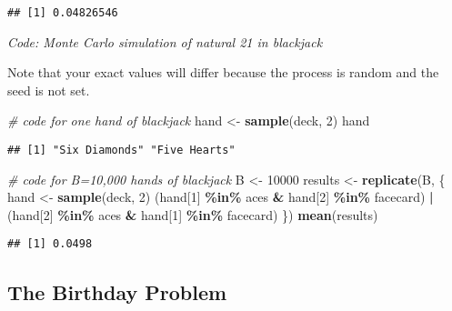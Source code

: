 \documentclass[
]{article}
\newenvironment{Shaded}{\begin{snugshade}}{\end{snugshade}}
\newcommand{\CommentTok}[1]{\textcolor[rgb]{0.56,0.35,0.01}{\textit{#1}}}
\newcommand{\DecValTok}[1]{\textcolor[rgb]{0.00,0.00,0.81}{#1}}
\newcommand{\KeywordTok}[1]{\textcolor[rgb]{0.13,0.29,0.53}{\textbf{#1}}}
\newcommand{\NormalTok}[1]{#1}
\newcommand{\OperatorTok}[1]{\textcolor[rgb]{0.81,0.36,0.00}{\textbf{#1}}}
\newcommand{\StringTok}[1]{\textcolor[rgb]{0.31,0.60,0.02}{#1}}
\begin{document}
\begin{verbatim}
## [1] 0.04826546
\end{verbatim}

\emph{Code: Monte Carlo simulation of natural 21 in blackjack}

Note that your exact values will differ because the process is random
and the seed is not set.

\begin{Shaded}
\begin{Highlighting}[]
\CommentTok{\# code for one hand of blackjack}
\NormalTok{hand \textless{}{-}}\StringTok{ }\KeywordTok{sample}\NormalTok{(deck, }\DecValTok{2}\NormalTok{)}
\NormalTok{hand}
\end{Highlighting}
\end{Shaded}

\begin{verbatim}
## [1] "Six Diamonds" "Five Hearts"
\end{verbatim}

\begin{Shaded}
\begin{Highlighting}[]
\CommentTok{\# code for B=10,000 hands of blackjack}
\NormalTok{B \textless{}{-}}\StringTok{ }\DecValTok{10000}
\NormalTok{results \textless{}{-}}\StringTok{ }\KeywordTok{replicate}\NormalTok{(B, \{}
\NormalTok{  hand \textless{}{-}}\StringTok{ }\KeywordTok{sample}\NormalTok{(deck, }\DecValTok{2}\NormalTok{)}
\NormalTok{  (hand[}\DecValTok{1}\NormalTok{] }\OperatorTok{\%in\%}\StringTok{ }\NormalTok{aces }\OperatorTok{\&}\StringTok{ }\NormalTok{hand[}\DecValTok{2}\NormalTok{] }\OperatorTok{\%in\%}\StringTok{ }\NormalTok{facecard) }\OperatorTok{|}\StringTok{ }\NormalTok{(hand[}\DecValTok{2}\NormalTok{] }\OperatorTok{\%in\%}\StringTok{ }\NormalTok{aces }\OperatorTok{\&}\StringTok{ }\NormalTok{hand[}\DecValTok{1}\NormalTok{] }\OperatorTok{\%in\%}\StringTok{ }\NormalTok{facecard)}
\NormalTok{\})}
\KeywordTok{mean}\NormalTok{(results)}
\end{Highlighting}
\end{Shaded}

\begin{verbatim}
## [1] 0.0498
\end{verbatim}

\hypertarget{the-birthday-problem}{%
\subsection{The Birthday Problem}\label{the-birthday-problem}}
\end{document}
